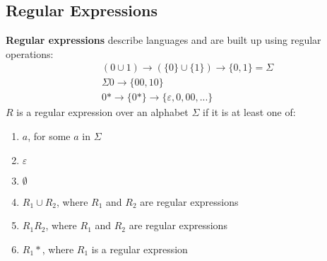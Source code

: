 \documentclass{article}
\begin{document}
\subsection{Regular Expressions}
\textbf{Regular expressions} describe languages and are built up using regular operations:
\begin{align*}
    &(0 \cup 1) \rightarrow (\{0\} \cup \{1\}) \rightarrow \{0,1\} = \Sigma \\
    &\Sigma 0 \rightarrow \{00,10\} \\
    &0* \rightarrow\{0*\} \rightarrow \{\varepsilon,0, 00, ...\}
\end{align*}
$R$ is a regular expression over an alphabet $\Sigma$ if it is at least one of:
\begin{enumerate}
    \item $a$, for some $a$ in $\Sigma$
    \item $\varepsilon$
    \item $\emptyset$
    \item $R_1 \cup R_2$, where $R_1$ and $R_2$ are regular expressions
    \item $R_1R_2$, where $R_1$ and $R_2$ are regular expressions
    \item $R_1*$, where $R_1$ is a regular expression
\end{enumerate}
\newpage
\end{document}

